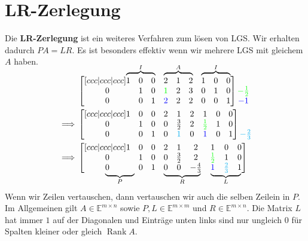 \documentclass[a4paper,10pt]{article}
\DeclareMathOperator{\Rank}{Rank}
\newcommand\undermat[2]{%
  \makebox[0pt][l]{$\smash{\underbrace{\phantom{%
    \begin{matrix}#2\end{matrix}}}_{\text{$#1$}}}$}#2}
\newcommand\overmat[2]{%
  \makebox[0pt][l]{$\smash{\overbrace{\phantom{%
    \begin{matrix}#2\end{matrix}}}^{\text{$#1$}}}$}#2}
\def\E{\mathbb{E}}
\begin{document}
\section{LR-Zerlegung}

Die \textbf{LR-Zerlegung} ist ein weiteres Verfahren zum lösen von LGS. Wir erhalten dadurch $PA = LR$. Es ist besonders effektiv wenn wir mehrere LGS mit gleichem $A$ haben.

\begin{align*}
  & \begin{bmatrix}[ccc|ccc|ccc]
    \overmat{I}{1 & 0 & 0} & \overmat{A}{2 & 1 & 2} & \overmat{I}{1 & 0 & 0}\\
    0 & 1 & 0 & \textcolor{green}{1} & 2 & 3 & 0 & 1 & 0\\
    0 & 0 & 1 & \textcolor{blue}{2} & 2 & 2 & 0 & 0 & 1
  \end{bmatrix} \begin{matrix}
    \\
    \textcolor{green}{-\frac{1}{2}}\\
    \textcolor{blue}{-1}
  \end{matrix}\\
  \implies & \begin{bmatrix}[ccc|ccc|ccc]
    1 & 0 & 0 & 2 & 1 & 2 & 1 & 0 & 0\\
    0 & 1 & 0 & 0 & \frac{3}{2} & 2 & \textcolor{green}{\frac{1}{2}} & 1 & 0\\
    0 & 0 & 1 & 0 & \textcolor{cyan}{1} & 0 & \textcolor{blue}{1} & 0 & 1
  \end{bmatrix} \begin{matrix}
    \\
    \\
    \textcolor{cyan}{-\frac{2}{3}}
  \end{matrix}\\
  \implies & \begin{bmatrix}[ccc|ccc|ccc]
    1 & 0 & 0 & 2 & 1 & 2 & 1 & 0 & 0\\
    0 & 1 & 0 & 0 & \frac{3}{2} & 2 & \textcolor{green}{\frac{1}{2}} & 1 & 0\\
    \undermat{P}{0 & 0 & 1} & \undermat{R}{0 & 0 & -\frac{4}{3}} & \undermat{L}{\textcolor{blue}{1} & \textcolor{cyan}{\frac{2}{3}} & 1}
  \end{bmatrix}
\end{align*}\\

Wenn wir Zeilen vertauschen, dann vertauschen wir auch die selben Zeilein in $P$. Im Allgemeinen gilt $A \in \E^{m \times n}$ sowie $P, L \in \E^{m \times m}$ und $R \in \E^{m \times n}$. Die Matrix $L$ hat immer $1$ auf der Diagonalen und Einträge unten links sind nur ungleich $0$ für Spalten kleiner oder gleich $\Rank A$.
\end{document}
